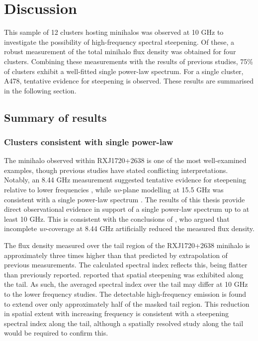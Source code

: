 \chapter[Discussion]{Discussion}
\label{Chap:Discussion}

This sample of 12 clusters hosting minihalos was observed at 10 GHz to investigate the possibility of high-frequency spectral steepening. Of these, a robust measurement of the total minihalo flux density was obtained for four clusters. Combining these measurements with the results of previous studies, 75\% of clusters exhibit a well-fitted single power-law spectrum. For a single cluster, A478, tentative evidence for steepening is observed. These results are summarised in the following section.

\section{Summary of results}

\subsection{Clusters consistent with single power-law}
The minihalo observed within RXJ1720+2638 is one of the most well-examined examples, though previous studies have stated conflicting interpretations. Notably, an 8.44 GHz measurement suggested tentative evidence for steepening relative to lower frequencies \citep{Giacintucci2014a}, while \textit{uv}-plane modelling at 15.5 GHz was consistent with a single power-law spectrum \citep{Perrott2021}. The results of this thesis provide direct observational evidence in support of a single power-law spectrum up to at least 10 GHz. This is consistent with the conclusions of \citet{Perrott2021}, who argued that incomplete \textit{uv}-coverage at 8.44 GHz artificially reduced the measured flux density. 

The flux density measured over the tail region of the RXJ1720+2638 minihalo is approximately three times higher than that predicted by extrapolation of previous measurements. The calculated spectral index reflects this, being flatter than previously reported. \citet{Giacintucci2014a} reported that spatial steepening was exhibited along the tail. As such, the averaged spectral index over the tail may differ at 10 GHz to the lower frequency studies. The detectable high-frequency emission is found to extend over only approximately half of the masked tail region. This reduction in spatial extent with increasing frequency is consistent with a steepening spectral index along the tail, although a spatially resolved study along the tail would be required to confirm this.

